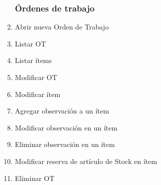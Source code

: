 \documentclass[12pt]{extarticle}
\begin{document}
\begin{spacing}{1.2}
\begin{multicols}{2}
\begin{enumerate}
            \subsubsection*{Órdenes de trabajo}
                \item Abrir nueva Orden de Trabajo
                \item Listar OT
                \item Listar ítems
                \item Modificar OT 
                \item Modificar ítem


                \item Agregar observación a un ítem
                \item Modificar observación en un ítem
                \item Eliminar observación en un ítem
                \item Modificar reserva de artículo de Stock en ítem
                \item Eliminar OT
                

\end{enumerate}
\end{multicols}
\end{spacing}
\end{document}
